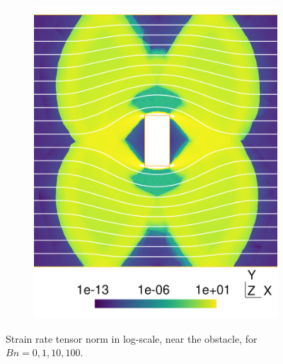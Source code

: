 \documentclass[11 pt]{report}
\begin{document}
\begin{figure}
\begin{subfigure}[t]{0.495\textwidth}
        \includegraphics[width=\textwidth]{../figures/cylinder_100.pdf}
        \label{fig:cylinder100}
    \end{subfigure}
    \caption{Strain rate tensor norm in log-scale, near the obstacle, for $Bn=0,1,10,100$.}
    \label{fig:cylinder}
\end{figure}
\end{document}
